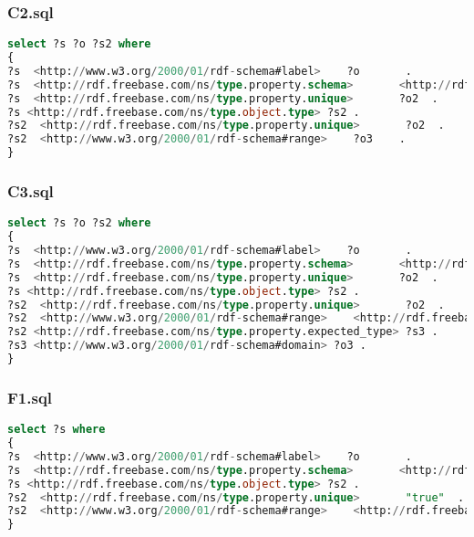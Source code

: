 \documentclass[titlepage, a4paper, 12pt] {article}
\begin{document}
\subsubsection{C2.sql}

\begin{lstlisting}[language=SQL] 
select ?s ?o ?s2 where
{
?s  <http://www.w3.org/2000/01/rdf-schema#label>    ?o       .
?s  <http://rdf.freebase.com/ns/type.property.schema>       <http://rdf.freebase.com/ns/american_football.football_player>   .
?s  <http://rdf.freebase.com/ns/type.property.unique>       ?o2  .
?s <http://rdf.freebase.com/ns/type.object.type> ?s2 .
?s2  <http://rdf.freebase.com/ns/type.property.unique>       ?o2  .
?s2  <http://www.w3.org/2000/01/rdf-schema#range>    ?o3    .
}
\end{lstlisting}

\subsubsection{C3.sql}

\begin{lstlisting}[language=SQL] 
select ?s ?o ?s2 where
{
?s  <http://www.w3.org/2000/01/rdf-schema#label>    ?o       .
?s  <http://rdf.freebase.com/ns/type.property.schema>       <http://rdf.freebase.com/ns/american_football.football_player>   .
?s  <http://rdf.freebase.com/ns/type.property.unique>       ?o2  .
?s <http://rdf.freebase.com/ns/type.object.type> ?s2 .
?s2  <http://rdf.freebase.com/ns/type.property.unique>       ?o2  .
?s2  <http://www.w3.org/2000/01/rdf-schema#range>    <http://rdf.freebase.com/ns/type.enumeration>    .
?s2 <http://rdf.freebase.com/ns/type.property.expected_type> ?s3 .
?s3 <http://www.w3.org/2000/01/rdf-schema#domain> ?o3 .
}
\end{lstlisting}

\subsubsection{F1.sql}

\begin{lstlisting}[language=SQL] 
select ?s where
{
?s  <http://www.w3.org/2000/01/rdf-schema#label>    ?o       .
?s  <http://rdf.freebase.com/ns/type.property.schema>       <http://rdf.freebase.com/ns/american_football.football_player>   .
?s <http://rdf.freebase.com/ns/type.object.type> ?s2 .
?s2  <http://rdf.freebase.com/ns/type.property.unique>       "true"  .
?s2  <http://www.w3.org/2000/01/rdf-schema#range>    <http://rdf.freebase.com/ns/type.enumeration>    .
}
\end{lstlisting}
\end{document}
